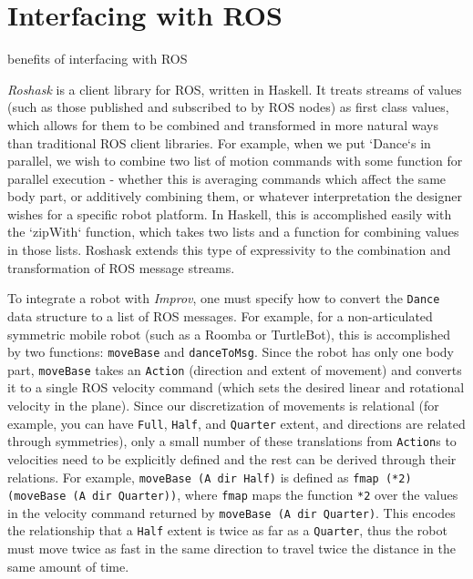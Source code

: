 \documentclass[sigconf]{acmart}
\begin{document}
\section{Interfacing with ROS}\label{interfacing-with-ros}



{\color{red}benefits of interfacing with ROS}


\emph{Roshask} is a client library for ROS, written in Haskell. It treats streams of values (such as those published
and subscribed to by ROS nodes) as first class values, which allows for them to
be combined and transformed in more natural ways than traditional ROS client
libraries. For example, when we put `Dance`s in parallel, we wish to combine two
list of motion commands with some function for parallel execution - whether this
is averaging commands which affect the same body part, or additively combining
them, or whatever interpretation the designer wishes for a specific robot
platform. In Haskell, this is accomplished easily with the
`zipWith` function, which takes two lists and a function for combining values in
those lists. Roshask extends this type of expressivity to the combination and
transformation of ROS message streams.

To integrate a robot with \emph{Improv}, one must
specify how to convert the \texttt{Dance} data structure to a list of ROS
messages. For example, for a non-articulated symmetric mobile robot (such as a Roomba or
TurtleBot), this is accomplished by two functions: \texttt{moveBase} and
\texttt{danceToMsg}. Since the robot has only one body part, \texttt{moveBase}
takes an \texttt{Action} (direction and extent of movement) and converts it to a
single ROS velocity command (which sets the desired linear and rotational
velocity in the plane). Since our discretization of movements is relational (for
example, you can have \texttt{Full}, \texttt{Half}, and \texttt{Quarter} extent,
and directions are related through symmetries), only a small number of these
translations from \texttt{Action}s to velocities need to be explicitly defined
and the rest can be derived through their relations. For example,
\texttt{moveBase (A dir Half)} is defined as \texttt{fmap (*2) (moveBase (A dir
Quarter))},
where \texttt{fmap} maps the function \texttt{*2} over the values in the velocity
command returned by \texttt{moveBase (A dir Quarter)}. This encodes the relationship
that a \texttt{Half} extent is twice as far as a \texttt{Quarter}, thus the
robot must move twice as fast in the same direction to travel twice the distance
in the same amount of time.
\end{document}
